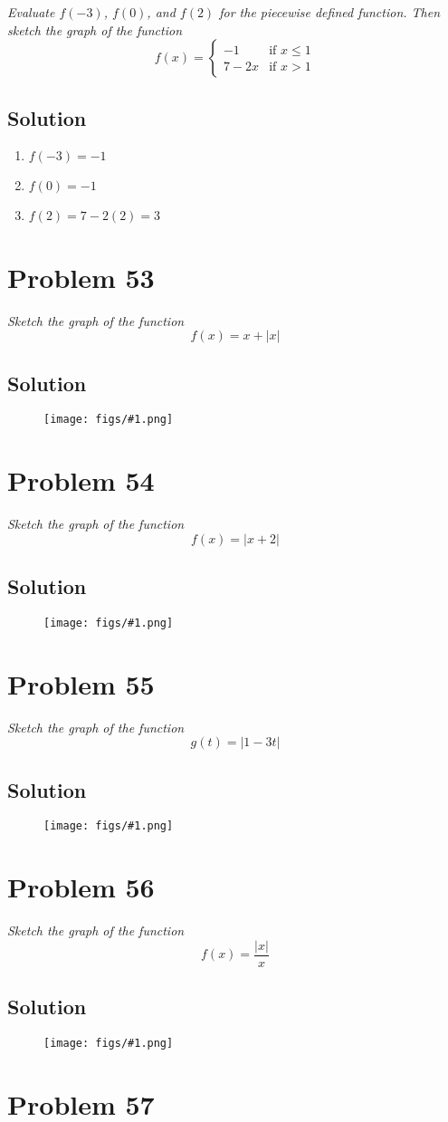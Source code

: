 \documentclass[11pt]{article}
\newcommand{\soln}{\subsection*}
\newcommand{\qn}{\textit}
\newcommand{\imgsoln}[1]{
	\begin{figure}[H]
		\centering
		\texttt{[image: figs/\#1.png]}
	\end{figure}
}
\begin{document}
\qn{Evaluate $f(-3)$, $f(0)$, and $f(2)$ for the piecewise defined function. Then sketch the graph of the function}
\begin{equation*}
	f(x)=
	\begin{cases}
		-1 & \text{if } x \le 1\\
		7-2x & \text{if } x > 1
	\end{cases}
\end{equation*}

\soln{Solution}
\begin{enumerate}
	\item $f(-3)=-1$
	\item $f(0)=-1$
	\item $f(2)=7-2(2)=3$
\end{enumerate}

\section*{Problem 53}

\qn{Sketch the graph of the function $$f(x)=x+|x|$$}

\soln{Solution}
\imgsoln{1.1.53-ans}

\section*{Problem 54}

\qn{Sketch the graph of the function $$f(x)=|x+2|$$}

\soln{Solution}
\imgsoln{1.1.54-ans}

\section*{Problem 55}

\qn{Sketch the graph of the function $$g(t)=|1-3t|$$}

\soln{Solution}
\imgsoln{1.1.55-ans}

\section*{Problem 56}

\qn{Sketch the graph of the function $$f(x)=\frac{|x|}{x}$$}

\soln{Solution}
\imgsoln{1.1.56-ans}

\section*{Problem 57}
\end{document}
